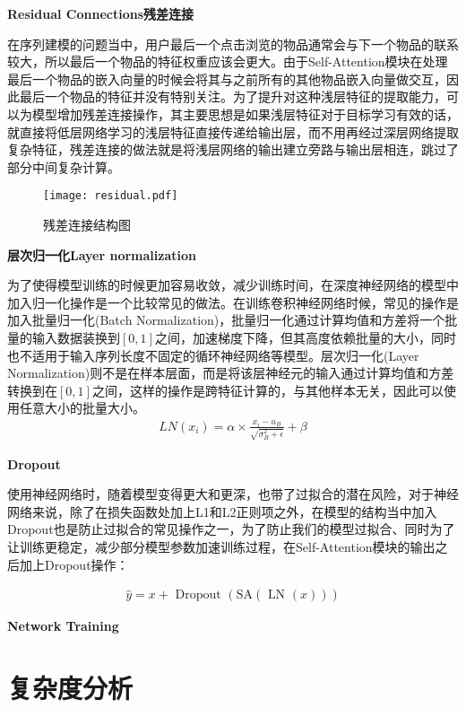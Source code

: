 \textbf{Residual Connections残差连接}

在序列建模的问题当中，用户最后一个点击浏览的物品通常会与下一个物品的联系较大，所以最后一个物品的特征权重应该会更大。由于Self-Attention模块在处理最后一个物品的嵌入向量的时候会将其与之前所有的其他物品嵌入向量做交互，因此最后一个物品的特征并没有特别关注。为了提升对这种浅层特征的提取能力，可以为模型增加残差连接操作，其主要思想是如果浅层特征对于目标学习有效的话，就直接将低层网络学习的浅层特征直接传递给输出层，而不用再经过深层网络提取复杂特征，残差连接的做法就是将浅层网络的输出建立旁路与输出层相连，跳过了部分中间复杂计算。

\begin{figure}
\centering
\texttt{[image: residual.pdf]}
\caption{残差连接结构图}
\label{residual}
\end{figure}

\textbf{层次归一化Layer normalization}

为了使得模型训练的时候更加容易收敛，减少训练时间，在深度神经网络的模型中加入归一化操作是一个比较常见的做法。在训练卷积神经网络时候，常见的操作是加入批量归一化(Batch Normalization)，批量归一化通过计算均值和方差将一个批量的输入数据装换到$[0,1]$之间，加速梯度下降，但其高度依赖批量的大小，同时也不适用于输入序列长度不固定的循环神经网络等模型。层次归一化(Layer Normalization)则不是在样本层面，而是将该层神经元的输入通过计算均值和方差转换到在$[0,1]$之间，这样的操作是跨特征计算的，与其他样本无关，因此可以使用任意大小的批量大小。
\begin{align}
	LN(x_i)=\alpha\times\frac{x_i-u_B}{\sqrt{\sigma_B^2+\epsilon}}+\beta
\end{align}

\textbf{Dropout}

使用神经网络时，随着模型变得更大和更深，也带了过拟合的潜在风险，对于神经网络来说，除了在损失函数处加上L1和L2正则项之外，在模型的结构当中加入Dropout也是防止过拟合的常见操作之一，为了防止我们的模型过拟合、同时为了让训练更稳定，减少部分模型参数加速训练过程，在Self-Attention模块的输出之后加上Dropout操作：

\begin{align}
	\hat{y}=x+\text { Dropout }(\text {SA}(\text { LN }(x)))
\end{align}

\textbf{Network Training}



\section{复杂度分析}


